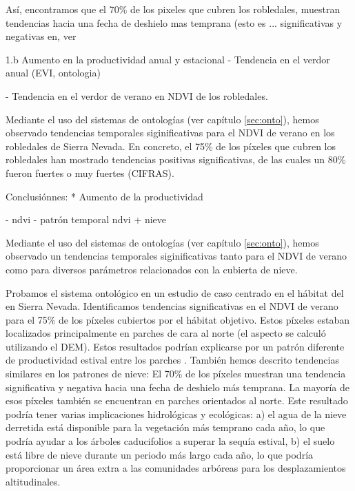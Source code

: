 Así, encontramos que el 70\% de los pixeles que cubren los robledales, muestran tendencias hacia una fecha de deshielo mas temprana (esto es ... significativas y negativas en, ver 



1.b Aumento en la productividad anual y estacional
- Tendencia en el verdor anual (EVI, ontologia)


- Tendencia en el verdor de verano en NDVI de los robledales.

Mediante el uso del sistemas de ontologías (ver capítulo \ref{sec:onto}), hemos observado tendencias temporales siginificativas para el NDVI de verano en los robledales de Sierra Nevada. En concreto, el 75\% de los píxeles que cubren los robledales han mostrado tendencias positivas significativas, de las cuales un 80\% fueron fuertes o muy fuertes (CIFRAS). 



Conclusiónnes: 
* Aumento de la productividad 






- ndvi 
- patrón temporal ndvi + nieve 

Mediante el uso del sistemas de ontologías (ver capítulo \ref{sec:onto}), hemos observado un tendencias temporales siginificativas tanto para el NDVI de verano como para diversos parámetros relacionados con la cubierta de nieve. 




Probamos el sistema ontológico en un estudio de caso centrado en el hábitat del \Qp en Sierra Nevada. Identificamos tendencias significativas en el NDVI de verano para el 75\% de los píxeles cubiertos por el hábitat objetivo. Estos píxeles estaban localizados principalmente en parches de cara al norte (el aspecto se calculó utilizando el DEM). Estos resultados podrían explicarse por un patrón diferente de productividad estival entre los parches \Qp. También hemos descrito tendencias similares en los patrones de nieve: El 70\% de los píxeles muestran una tendencia significativa y negativa hacia una fecha de deshielo más temprana. La mayoría de esos píxeles también se encuentran en parches orientados al norte. Este resultado podría tener varias implicaciones hidrológicas y ecológicas: a) el agua de la nieve derretida está disponible para la vegetación más temprano cada año, lo que podría ayudar a los árboles caducifolios a superar la sequía estival, b) el suelo está libre de nieve durante un periodo más largo cada año, lo que podría proporcionar un área extra a las comunidades arbóreas para los desplazamientos altitudinales.

